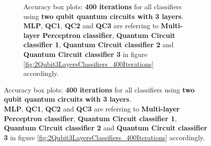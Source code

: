 \begin{figure}[!h]
\begin{subfigure}{1.0\textwidth}
\begin{subfigure}{1.0\textwidth}
{            }
        \end{subfigure}
        \begin{subfigure}{1.0\textwidth}
            \centering
        \end{subfigure}
        \begin{subfigure}{1.0\textwidth}
            \centering
        \end{subfigure}
        \caption{Accuracy box plots: \textbf{400 iterations} for all classifiers using \textbf{two qubit quantum circuits with 3 layers}.\\ \textbf{MLP}, \textbf{QC1}, \textbf{QC2} and \textbf{QC3} are referring to \textbf{Multi-layer Perceptron classifier}, \textbf{Quantum Circuit classifier 1}, \textbf{Quantum Circuit classifier 2} and \textbf{Quantum Circuit classifier 3} in figure \ref{fig:2Qubit3LayersClassifiers_400Iterations} accordingly.}
        \label{fig:2Qubit3LayersClassifiers_400Iterations_boxplot}
    \end{subfigure}
\end{figure}

